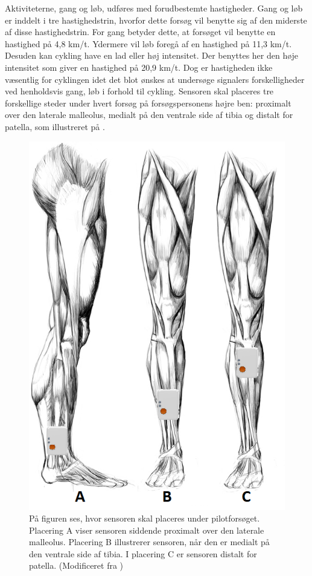 Aktiviteterne, gang og løb, udføres med forudbestemte hastigheder. \newline
Gang og løb er inddelt i tre hastighedstrin, hvorfor dette forsøg vil benytte sig af den miderste af disse hastighedstrin. For gang betyder dette, at forsøget vil benytte en hastighed på 4,8 km/t. Ydermere vil løb foregå af en hastighed på 11,3 km/t. Desuden kan cykling have en lad eller høj intensitet. Der benyttes her den høje intensitet som giver en hastighed på 20,9 km/t. Dog er hastigheden ikke væsentlig for cyklingen idet det blot ønskes at undersøge signalers forskelligheder ved henholdsvis gang, løb i forhold til cykling. \citep{Miles 2007} \newline
Sensoren skal placeres tre forskellige steder under hvert forsøg på forsøgspersonens højre ben: proximalt over den laterale malleolus, medialt på den ventrale side af tibia og distalt for patella, som illustreret på .
\begin{figure}[H]
	\centering
	\includegraphics[scale=0.6]{figures/qBilag/Sensor_placering.png}
	\caption{På figuren ses, hvor sensoren skal placeres under pilotforsøget. Placering A viser sensoren siddende proximalt over den laterale malleolus. Placering B illustrerer sensoren, når den er medialt på den ventrale side af tibia. I placering C er sensoren distalt for patella. (Modificeret fra \cite{Perna2016,Shimmer2016})}
	\label{fig:sensor_placering2}
\end{figure}



